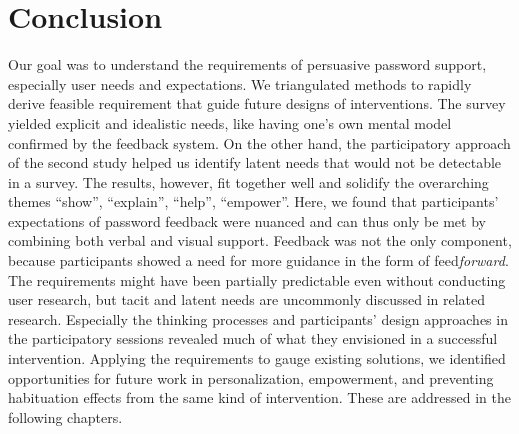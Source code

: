 \section{Conclusion}
Our goal was to understand the requirements of persuasive password support, especially user needs and expectations. 
We triangulated methods to rapidly derive feasible requirement that guide future designs of interventions. 
The survey yielded explicit and idealistic needs, like having one's own mental model confirmed by the feedback system. On the other hand, the participatory approach of the second study helped us identify latent needs that would not be detectable in a survey. The results, however, fit together well and solidify the overarching themes ``show'', ``explain'', ``help'', ``empower''. 
Here, we found that participants' expectations of password feedback were nuanced and can thus only be met by combining both verbal and visual support. Feedback was not the only component, because participants showed a need for more guidance in the form of feed\textit{forward}.
The requirements might have been partially predictable even without conducting user research, but tacit and latent needs are uncommonly discussed in related research. Especially the thinking processes and participants' design approaches in the participatory sessions revealed much of what they envisioned in a successful intervention.
Applying the requirements to gauge existing solutions, we identified opportunities for future work in personalization, empowerment, and preventing habituation effects from the same kind of intervention. These are addressed in the following chapters. 

